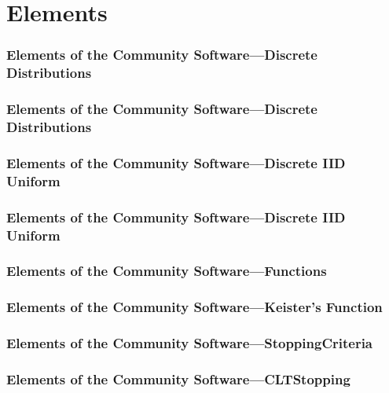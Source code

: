 \documentclass[11pt,compress,xcolor={usenames,dvipsnames},aspectratio=169]{beamer}
\begin{document}
\section{Elements}

\begin{frame}[fragile]
\frametitle{Elements of the Community Software---Discrete Distributions}
\vspace{-5ex}

\end{frame}

\begin{frame}[fragile]
\frametitle{Elements of the Community Software---Discrete Distributions}
\vspace{-5ex}

\end{frame}

\begin{frame}[fragile]
\frametitle{Elements of the Community Software---Discrete IID Uniform}
\vspace{-5ex}

\end{frame}

\begin{frame}[fragile]
\frametitle{Elements of the Community Software---Discrete IID Uniform}
\vspace{-5ex}

\end{frame}

\begin{frame}[fragile]
\frametitle{Elements of the Community Software---Functions}
\vspace{-5ex}

\end{frame}

\begin{frame}[fragile]
\frametitle{Elements of the Community Software---Keister's Function}
\vspace{-5ex}

\end{frame}

\begin{frame}[fragile]
\frametitle{Elements of the Community Software---StoppingCriteria}
\vspace{-5ex}

\end{frame}

\begin{frame}[fragile]
\frametitle{Elements of the Community Software---CLTStopping}
\vspace{-5ex}

\end{frame}
\end{document}
